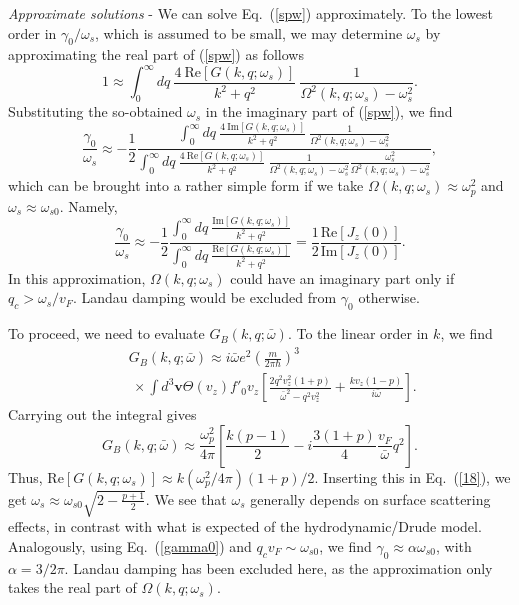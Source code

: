\documentclass[aps,reprint]{revtex4-1}
\begin{document}
\textit{Approximate solutions} - We can solve Eq.~(\ref{spw}) approximately. To the lowest order in $\gamma_0/\omega_s$, which is assumed to be small, we may determine $\omega_s$ by approximating the real part of (\ref{spw}) as follows
\begin{equation}
1 \approx \int^{\infty}_0 dq~\frac{4~\mbox{Re}\left[G(k,q;\omega_s)\right]}{k^2+q^2}~\frac{1}{\Omega^2(k,q;\omega_s) - \omega^2_s}. \label{18}
\end{equation}
Substituting the so-obtained $\omega_s$ in the imaginary part of (\ref{spw}), we find
\begin{equation}
\frac{\gamma_0}{\omega_s} \approx -\frac{1}{2}\frac{\int^{\infty}_0 dq~\frac{4~\mbox{Im}\left[G(k,q;\omega_s)\right]}{k^2+q^2}~\frac{1}{\Omega^2(k,q;\omega_s) - \omega^2_s}}{ \int^{\infty}_0 dq~\frac{4~\mbox{Re}\left[G(k,q;\omega_s)\right]}{k^2+q^2}~\frac{1}{\Omega^2(k,q;\omega_s) - \omega^2_s} \frac{\omega^2_s}{\Omega^2(k,q;\omega_s)-\omega^2_s}},
\end{equation}
which can be brought into a rather simple form if we take $\Omega(k,q;\omega_s)\approx \omega^2_p$ and $\omega_s\approx \omega_{s0}$. Namely, 
\begin{equation}
\frac{\gamma_0}{\omega_s} \approx -\frac{1}{2}\frac{\int^{\infty}_0 dq~\frac{\mbox{Im}\left[G(k,q;\omega_s)\right]}{k^2+q^2}}{\int^{\infty}_0 dq~\frac{\mbox{Re}\left[G(k,q;\omega_s)\right]}{k^2+q^2}} = \frac{1}{2}\frac{\mbox{Re}\left[J_z(0)\right]}{\mbox{Im}\left[J_z(0)\right]}. \label{gamma0}
\end{equation} 
In this approximation, $\Omega(k,q;\omega_s)$ could have an imaginary part only if $q_c>\omega_s/v_F$. Landau damping would be excluded from $\gamma_0$ otherwise. 

To proceed, we need to evaluate $G_B(k,q;\bar{\omega})$. To the linear order in $k$, we find
\begin{eqnarray}
&~&G_{B}(k,q;\bar{\omega}) \approx i\bar{\omega}e^2\left(\frac{m}{2\pi\hbar}\right)^3 \nonumber \\ &~& ~ \times  \int d^3\mathbf{v} \Theta(v_z)f'_0v_z\left[\frac{2q^2v^2_z(1+p)}{\bar{\omega}^2-q^2v^2_z} + \frac{kv_z(1-p)}{i\bar{\omega}}\right]. \label{gbb}
\end{eqnarray}
Carrying out the integral gives 
\begin{equation}
G_B(k,q;\bar{\omega}) \approx \frac{\omega^2_p}{4\pi}\left[\frac{k(p-1)}{2} - i \frac{3(1+p)}{4}\frac{v_F}{\bar{\omega}}q^2\right]. 
\end{equation}
Thus, Re$\left[G(k,q;\omega_s)\right] \approx k(\omega^2_p/4\pi)(1+p)/2$. Inserting this in Eq.~(\ref{18}), we get $\omega_s \approx \omega_{s0}\sqrt{2-\frac{p+1}{2}}. $
We see that $\omega_s$ generally depends on surface scattering effects, in contrast with what is expected of the hydrodynamic/Drude model. Analogously, using Eq.~(\ref{gamma0}) and $q_cv_F \sim \omega_{s0}$, we find $\gamma_0 \approx \alpha \omega_{s0}$, with $\alpha = 3/2\pi$. Landau damping has been excluded here, as the approximation only takes the real part of $\Omega(k,q;\omega_s)$. 
\end{document}
